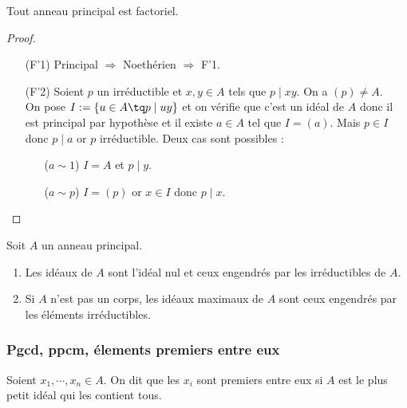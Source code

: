 \begin{coro}
 
Tout anneau principal est factoriel.
\end{coro}

\begin{proof}\
\begin{itemize}
 \item [(F'1)] Principal $\Rightarrow$ Noethérien $\Rightarrow$ F'1.
 \item [(F'2)] Soient $p$ un irréductible et $x,y\in A$ tels que $p\mid xy$. On
a $(p) \neq A$.\\ On pose $I := \{u\in A \tq p \mid uy\}$ et on vérifie que
c'est un idéal de $A$ donc il est principal par hypothèse et il existe $a\in A$
tel que $I = (a)$. Mais $p\in I$ donc $p\mid a$ or $p$ irréductible. Deux cas
sont possibles :
\begin{itemize}
 \item [($a\sim 1$)] $I=A$ et $p\mid y$.
 \item [($a\sim p$)] $I=(p)$ or $x\in I$ donc $p\mid x$.
\end{itemize}
\end{itemize}
\end{proof}

\begin{coro}
 
Soit $A$ un anneau principal.
\begin{enumerate}
 \item Les idéaux de $A$ sont l'idéal nul et ceux engendrés par les
irréductibles de $A$.
 \item Si $A$ n'est pas un corps, les idéaux maximaux de $A$ sont ceux
engendrés par les éléments irréductibles.
\end{enumerate}
\end{coro}

\subsubsection{Pgcd, ppcm, élements premiers entre eux}
\vspace{0.5em}

\begin{defi}

Soient $x_1,\cdots,x_n \in A$. On dit que les $x_i$ sont premiers entre eux si
$A$ est le plus petit idéal qui les contient tous.
\end{defi}

